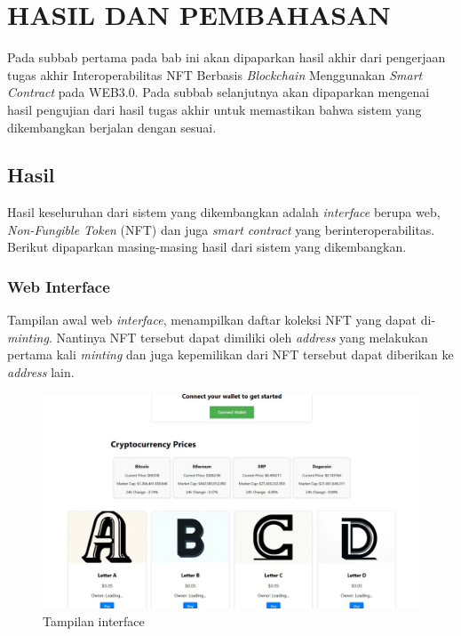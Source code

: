 \chapter{HASIL DAN PEMBAHASAN}
Pada subbab pertama pada bab ini akan dipaparkan hasil akhir dari pengerjaan tugas akhir Interoperabilitas NFT Berbasis \emph{Blockchain} Menggunakan \emph{Smart Contract} pada WEB3.0. Pada subbab selanjutnya akan dipaparkan mengenai hasil pengujian dari hasil tugas akhir untuk memastikan bahwa sistem yang dikembangkan berjalan dengan sesuai.

\section{Hasil}
Hasil keseluruhan dari sistem yang dikembangkan adalah \emph{interface} berupa web, \emph{Non-Fungible Token} (NFT) dan juga \emph{smart contract} yang berinteroperabilitas. Berikut dipaparkan masing-masing hasil dari sistem yang dikembangkan.

\subsection{Web Interface}
Tampilan awal web \emph{interface}, menampilkan daftar koleksi NFT yang dapat di-\emph{minting}. Nantinya NFT tersebut dapat dimiliki oleh \emph{address} yang melakukan pertama kali \emph{minting} dan juga kepemilikan dari NFT tersebut dapat diberikan ke \emph{address} lain.
\begin{figure} [H] \centering
  \includegraphics[scale=0.28]{gambar/web_interface.jpeg}
  \caption{Tampilan interface}
  \label{fig:interface}
\end{figure}

